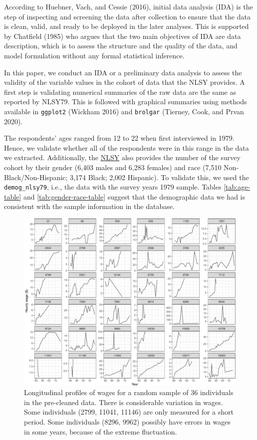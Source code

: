 \documentclass{article}
\begin{document}
According to Huebner, Vach, and Cessie (2016), initial data analysis (IDA) is the step of inspecting and screening the data after collection to ensure that the data is clean, valid, and ready to be deployed in the later analyses. This is supported by Chatfield (1985) who argues that the two main objectives of IDA are data description, which is to assess the structure and the quality of the data, and model formulation without any formal statistical inference.

In this paper, we conduct an IDA or a preliminary data analysis to assess the validity of the variable values in the cohort of data that the NLSY provides. A first step is validating numerical summaries of the raw data are the same as reported by NLSY79. This is followed with graphical summaries using methods available in \texttt{ggplot2} (Wickham 2016) and \texttt{brolgar} (Tierney, Cook, and Prvan 2020).

The respondents' ages ranged from 12 to 22 when first interviewed in 1979. Hence, we validate whether all of the respondents were in this range in the data we extracted. Additionally, the \href{https://www.nlsinfo.org/content/cohorts/nlsy79/intro-to-the-sample/nlsy79-sample-introduction}{NLSY} also provides the number of the survey cohort by their gender (6,403 males and 6,283 females) and race (7,510 Non-Black/Non-Hispanic; 3,174 Black; 2,002 Hispanic). To validate this, we used the \texttt{demog\_nlsy79}, i.e., the data with the survey years 1979 sample. Tables \ref{tab:age-table} and \ref{tab:gender-race-table} suggest that the demographic data we had is consistent with the sample information in the database.

\begin{figure}

{\centering \includegraphics[width=1\linewidth]{figures/sample-plot-1} 

}

\caption{Longitudinal profiles of wages for a random sample of 36 individuals in the pre-cleaned data. There is considerable variation in wages. Some individuals  (2799, 11041, 11146) are only measured for a short period. Some individuals (8296, 9962) possibly have errors in wages in some years, because of the extreme fluctuation.}\label{fig:sample-plot}
\end{figure}
\end{document}
